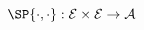 \begin{equation}
    \label{eq:AvalInProd}
    \SP{\cdot,\cdot} : \mathcal{E} \times \mathcal{E} \to \mathcal{A}
\end{equation}

